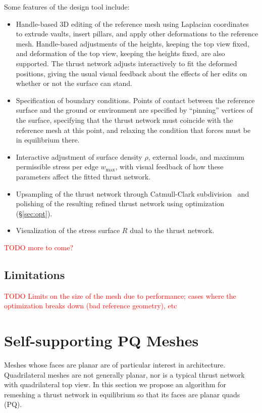 \documentclass[annual]{acmsiggraph}
\newcommand{\todo}[1]{\textcolor{red}{#1}}
\newcommand{\secref}[1]{(\S\ref{#1})}
\begin{document}
Some features of the design tool include:
\begin{itemize}
\item Handle-based 3D editing of the reference mesh using Laplacian coordinates~\cite{Lipman2004,Sorkine2003} to extrude vaults, insert pillars, and apply other deformations to the reference mesh. Handle-based adjustments of the heights, keeping the top view fixed, and deformation of the top view, keeping the heights fixed, are also supported. The thrust network adjusts interactively to fit the deformed positions, giving the usual visual feedback about the effects of her edits on whether or not the surface can stand.
\item Specification of boundary conditions. Points of contact between the reference surface and the ground or environment are specified by ``pinning'' vertices of the surface, specifying that the thrust network must coincide with the reference mesh at this point, and relaxing the condition that forces must be in equilibrium there. 
\item Interactive adjustment of surface density $\rho$, external loads, and maximum permissible stress per edge $w_{\textrm{max}}$, with visual feedback of how these parameters affect the fitted thrust network.
\item Upsampling of the thrust network through Catmull-Clark subdivision~\cite{TODO} and polishing of the resulting refined thrust network using optimization \secref{sec:opt}.
\item Visualization of the stress surface $R$ dual to the thrust network.
\end{itemize}
\todo{TODO more to come?}
\subsection{Limitations}
\todo{TODO Limits on the size of the mesh due to performance; cases where the optimization breaks down (bad reference geometry), etc}

\section{Self-supporting PQ Meshes} \label{sec:pq}
Meshes whose faces are planar are of particular interest in architecture. Quadrilateral meshes are not generally planar, nor is a typical thrust network with quadrilateral top view. In this section we propose an algorithm for remeshing a thrust network in equilibrium so that its faces are planar quads (PQ).
\end{document}
